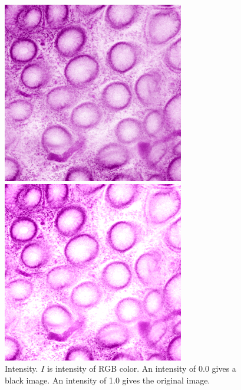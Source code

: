 \begin{figure}[H]
\begin{minipage}{0.25\columnwidth}
		\includegraphics[clip, width=\linewidth]{fig/preprocessing/data_aug/color/BRIGHTNESS/BRIGHTNESS_1_00}
	\end{minipage}
	\begin{minipage}{0.25\columnwidth}
		\centering
		\includegraphics[clip, width=\linewidth]{fig/preprocessing/data_aug/color/BRIGHTNESS/BRIGHTNESS_1_20}
	\end{minipage}
	
	\caption{Intensity. $I$ is intensity of RGB color. An intensity of 0.0 gives a black image. An intensity of 1.0 gives the original image.}
	\label{fig:輝度}
	
\end{figure}


